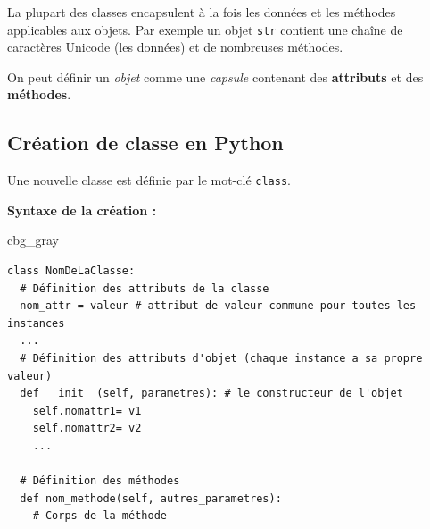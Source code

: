 \documentclass[%
oneside,                 %
final,                   %
10pt]{article}
\newenvironment{_cod_tight}[1]{
   \def\FrameCommand{\colorbox{#1}}
   \FrameRule0.6pt\MakeFramed {\FrameRestore}\vskip3mm}
   {\vskip0mm\endMakeFramed}
\newenvironment{cod}[1]{
\bgroup\rmfamily
\fboxsep=0mm\relax
\begin{_cod_tight}{#1}
\list{}{\parsep=-2mm\parskip=0mm\topsep=0pt\leftmargin=2mm
\rightmargin=2\leftmargin\leftmargin=4pt\relax}
\item\relax}
{\endlist\end{_cod_tight}\egroup}
\begin{document}
\noindent
La plupart des classes encapsulent à la fois les données et les méthodes applicables aux objets. Par exemple un objet \texttt{str} contient une chaîne de caractères Unicode (les données) et de nombreuses méthodes.

On peut définir un \emph{objet} comme une \emph{capsule} contenant des \textbf{attributs} et des \textbf{méthodes}.

\subsection{Création de classe en Python}
Une nouvelle classe est définie par le mot-clé \texttt{class}.

\textbf{Syntaxe de la création :}

\begin{cod}{cbg_gray}\begin{verbatim}
class NomDeLaClasse:
  # Définition des attributs de la classe
  nom_attr = valeur # attribut de valeur commune pour toutes les instances
  ...
  # Définition des attributs d'objet (chaque instance a sa propre valeur)
  def __init__(self, parametres): # le constructeur de l'objet
    self.nomattr1= v1
    self.nomattr2= v2
    ...

  # Définition des méthodes
  def nom_methode(self, autres_parametres):
    # Corps de la méthode
\end{verbatim}
\end{cod}
\noindent
\end{document}
